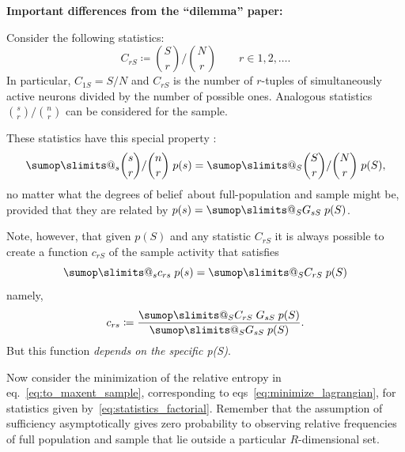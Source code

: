\documentclass[\ifafour a4paper,12pt,\else a5paper,10pt,\fi%
onecolumn,oneside,article,%
british%
]{memoir}
\makeatletter
\theoremstyle{remark}
\theoremstyle{innote}
\def\sum{\DOTSI\sumop\slimits@}
\newcommand*{\citep}{\parencites}
\newcommand*{\defd}{\coloneqq}
\renewcommand*{\|}{\nonscript\,\vert\nonscript\;\mathopen{}}
\newcommand*{\eqn}{eq.}%
\newcommand*{\eqns}{eqs}%
\newcommand*{\dobs}{degrees of belief}
\newcommand*{\yS}{S}
\newcommand*{\ys}{s}
\makeatother
\begin{document}
\bigskip

\textbf{Important differences from the \enquote{dilemma} paper:}

Consider the following statistics:
\begin{equation}
  \label{eq:statistics_factorial}
  C_{r\yS} \defd \binom{\yS}{r}/\binom{N}{r}
  \qquad r\in{1,2,\dotsc}.
\end{equation}
In particular, $C_{1\yS} = \yS/N$ and $C_{r\yS}$ is the number of
$r$-tuples of simultaneously active neurons divided by the number of
possible ones. Analogous statistics $\binom{\ys}{r}/\binom{n}{r}$ can
be considered for the sample.

These statistics have this special property
\citep{portamanaetal2015,portamanaetal2018b}:
\begin{equation}
  \label{eq:equality_statistics_sample_pop}
  \sum_{\ys} \binom{\ys}{r}/\binom{n}{r}\;p(\ys)
=   \sum_{\yS} \binom{\yS}{r}/\binom{N}{r}\;p(\yS),
\end{equation}
no matter what the \dobs\ about full-population and sample might be,
provided that they are related by $p(\ys) = \sum_{\yS}G_{\ys\yS}\;p(\yS)$.

Note, however, that given $p(\yS)$ and any statistic $C_{r\yS}$ it is
always possible to create a function $c_{r\yS}$ of the sample activity that
satisfies
\begin{equation}
  \label{eq:equality_statistics_general}
  \sum_{\ys} c_{r\ys}\;p(\ys)
  =   \sum_{\yS} C_{r\yS}\;p(\yS)
\end{equation}
namely,
\begin{equation}
  \label{eq:ad-hoc_statistics}
  c_{r\ys} \defd \frac{\sum_{\yS} C_{r\yS}\;G_{\ys\yS}\;p(\yS)}{
    \sum_{\yS}G_{\ys\yS}\;p(\yS)}.
\end{equation}
But this function \emph{depends on the specific p(\yS)}.

Now consider the minimization of the relative entropy in
\eqn~\eqref{eq:to_maxent_sample}, corresponding to
\eqns~\eqref{eq:minimize_lagrangian}, for statistics given
by~\eqref{eq:statistics_factorial}. Remember that the assumption of
sufficiency asymptotically gives zero probability to observing relative
frequencies of full population and sample that lie outside a particular
$R$-dimensional set.
\end{document}
